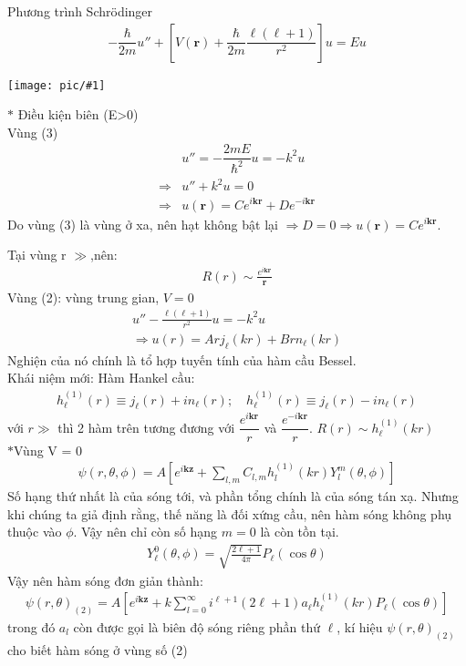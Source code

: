 \documentclass{report}
\newcommand{\image}[1]{
	\begin{center}
		\texttt{[image: pic/\#1]}
	\end{center}
}
\renewcommand{\l}{\ell}
\begin{document}
Phương trình Schr\"{o}dinger
\begin{align*}
	-\dfrac{\hbar}{2m}u'' + \left[V(\mathbf{r})+ \dfrac{\hbar}{2m}\dfrac{\l(\l+1)}{r^2}\right]u = Eu
\end{align*}
\image{zone.png}
$\ast$ Điều kiện biên (E>0)\\
Vùng (3)
\begin{align*}
	            & u'' = -\dfrac{2mE}{\hbar^2}u = -k^2u                \\
	\Rightarrow & u'' + k^2u =0                                       \\
	\Rightarrow & u(\mathbf{r})=Ce^{i\mathbf{kr}} +De^{-i\mathbf{kr}}
\end{align*}
Do vùng (3) là vùng ở xa, nên hạt không bật lại $\Rightarrow D = 0 \Rightarrow u(\mathbf{r})=Ce^{i\mathbf{kr}}$.

Tại vùng r $\gg$,nên:
\begin{align*}
	R(r) \sim \frac{e^{i\mathbf{kr}}}{\mathbf{r}}
\end{align*}
Vùng (2): vùng trung gian, $V=0$
\begin{align*}
	u'' - \frac{\l(\l+1)}{r^2}u = -k^2u \\
	\Rightarrow u(r) = Arj_{\l}(kr)+  Brn_{\l}(kr)
\end{align*}
Nghiện của nó chính là tổ hợp tuyến tính của hàm cầu Bessel.\\
Khái niệm mới: Hàm Hankel cầu:
\begin{align}
	h_{\l}^{(1)}(r) \equiv j_{\l}(r) + in_{\l}(r); \quad h_{\l}^{(1)}(r) \equiv j_{\l}(r) - in_{\l}(r)
\end{align}\label{eq1.3}
với $r \gg$ thì 2 hàm trên tương đương với $\dfrac{e^{i\mathbf{kr}}}{r}$ và $\dfrac{e^{-i\mathbf{kr}}}{r}$. $R(r)\sim h_{\l}^{(1)}(kr)$\\
$\ast$Vùng V = 0
\begin{align*}
	\psi(r,\theta,\phi) = A \left[e^{i\mathbf{kz}} + \sum_{l,m}C_{l,m} h_l^{(1)}(kr) Y_l^m(\theta,\phi)  \right]
\end{align*}
Số hạng thứ nhất là của sóng tới, và phần tổng chính là của sóng tán xạ. Nhưng khi chúng ta giả định rằng, thế năng là đối xứng cầu, nên hàm sóng không phụ thuộc vào $\phi$. Vậy nên chỉ còn số hạng $m=0$ là còn tồn tại.
\begin{align*}
	Y_{\l}^0 (\theta,\phi) = \sqrt{\frac{2\l+1}{4\pi}}P_{\l}(\cos\theta)
\end{align*}
Vậy nên hàm sóng đơn giản thành:
\begin{align*}
	\psi(r,\theta)_{(2)} = A \left[e^{i\mathbf{kz}} + k\sum_{l=0}^{\infty}i^{\l+1}(2\l+1)a_{\l} h_{\l}^{(1)}(kr) P_{\l}(\cos\theta)\right]
\end{align*}
trong đó $a_l$ còn được gọi là biên độ sóng riêng phần thứ $\l$, kí hiệu $\psi(r,\theta)_{(2)}$ cho biết hàm sóng ở vùng số (2)
\end{document}
